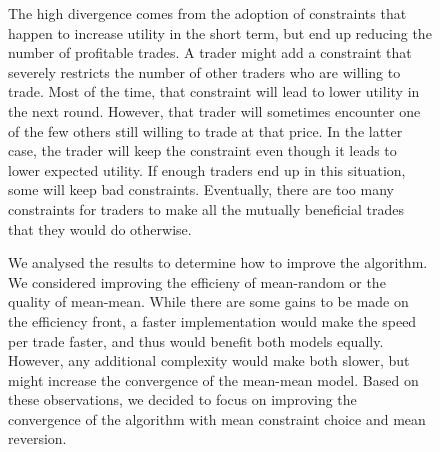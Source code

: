 \documentclass[12pt,a4paper,titlepage]{article}
\newcommand{\co}[1]{\textsf{#1}}
\begin{document}
\begin{figure}[H]
The high divergence comes from the adoption of constraints that happen to increase utility in the short term, but end up reducing the number of profitable trades.
A trader might add a constraint that severely restricts the number of other traders who are willing to trade.
Most of the time, that constraint will lead to lower utility in the next round.
However, that trader will sometimes encounter one of the few others still willing to trade at that price.
In the latter case, the trader will keep the constraint even though it leads to lower expected utility.
If enough traders end up in this situation, some will keep bad constraints.
Eventually, there are too many constraints for traders to make all the mutually beneficial trades that they would do otherwise.

We analysed the results to determine how to improve the algorithm.
We considered improving the efficieny of \co{mean}-\co{random} or the quality of \co{mean}-\co{mean}.
While there are some gains to be made on the efficiency front, a faster implementation would make the speed per trade faster, and thus would benefit both models equally.
However, any additional complexity would make both slower, but might increase the convergence of the \co{mean}-\co{mean} model.
Based on these observations, we decided to focus on improving the convergence of the algorithm with \co{mean} constraint choice and \co{mean} reversion.



\end{figure}
\end{document}
